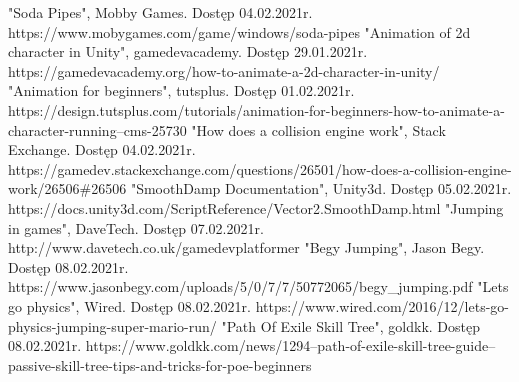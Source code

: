 \documentclass[oneside,polski,logo]{amuthesis}
\begin{document}
\begin{thebibliography}{7}
"Soda Pipes", Mobby Games. Dostęp 04.02.2021r.
https://www.mobygames.com/game/windows/soda-pipes
"Animation of 2d character in Unity", gamedevacademy. Dostęp 29.01.2021r.
https://gamedevacademy.org/how-to-animate-a-2d-character-in-unity/
"Animation for beginners", tutsplus. Dostęp 01.02.2021r.
https://design.tutsplus.com/tutorials/animation-for-beginners-how-to-animate-a-character-running--cms-25730
"How does a collision engine work", Stack Exchange. Dostęp 04.02.2021r.
https://gamedev.stackexchange.com/questions/26501/how-does-a-collision-engine-work/26506\#26506
"SmoothDamp Documentation", Unity3d. Dostęp 05.02.2021r.
https://docs.unity3d.com/ScriptReference/Vector2.SmoothDamp.html
"Jumping in games", DaveTech. Dostęp 07.02.2021r.
http://www.davetech.co.uk/gamedevplatformer
"Begy Jumping", Jason Begy. Dostęp 08.02.2021r.
https://www.jasonbegy.com/uploads/5/0/7/7/50772065/begy\_jumping.pdf
"Lets go physics", Wired. Dostęp 08.02.2021r.
https://www.wired.com/2016/12/lets-go-physics-jumping-super-mario-run/
"Path Of Exile Skill Tree", goldkk. Dostęp 08.02.2021r.
https://www.goldkk.com/news/1294--path-of-exile-skill-tree-guide--passive-skill-tree-tips-and-tricks-for-poe-beginners
\end{thebibliography}
\end{document}
